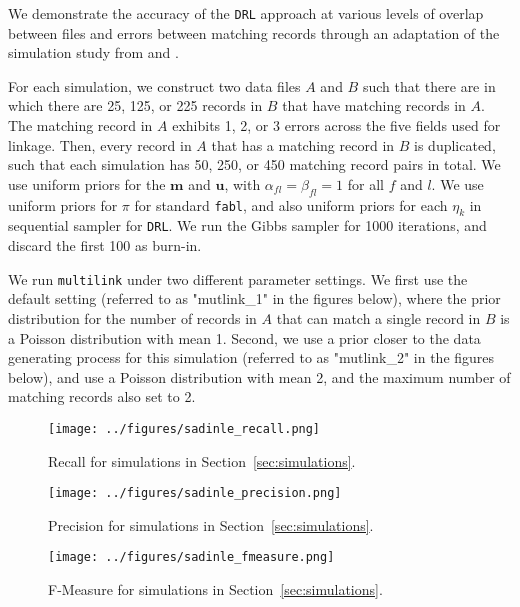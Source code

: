 \documentclass[12pt,letterpaper]{article}
\newcommand{\1}[1]{\mathbb{I}\!\left[#1\right]} %
\begin{document}
We demonstrate the accuracy of the \texttt{DRL} approach at various levels of overlap between files and errors between matching records through an adaptation of the simulation study from \cite{sadinle_bayesian_2017} and \cite{kundinger_2023}. 

For each simulation, we construct two data files $A$ and $B$ such that there are in which there are 25, 125, or 225 records in $B$ that have matching records in $A$. The matching record in $A$ exhibits 1, 2, or 3 errors across the five fields used for linkage. Then, every record in $A$ that has a matching record in $B$ is duplicated, such that each simulation has 50, 250, or 450 matching record pairs in total. We use uniform priors for the $\bm{m}$ and $\bm{u}$, with $\alpha_{fl} = \beta_{fl} = 1$ for all $f$ and $l$. We use uniform priors for $\pi$ for standard \texttt{fabl}, and also uniform priors for each $\eta_k$ in sequential sampler for \texttt{DRL}. We run the Gibbs sampler for 1000 iterations, and discard the first 100 as burn-in.

We run \texttt{multilink} under two different parameter settings. We first use the default setting (referred to as "mutlink\_1" in the figures below), where the prior distribution for the number of records in $A$ that can match a single record in $B$ is a Poisson distribution with mean 1. Second, we use a prior closer to the data generating process for this simulation (referred to as "mutlink\_2" in the figures below), and use a Poisson distribution with mean 2, and the maximum number of matching records also set to 2. 


\begin{figure}[t]
	\centering
	\texttt{[image: ../figures/sadinle\_recall.png]}
	\caption{Recall for simulations in Section~\ref{sec:simulations}.}
	\label{fig:sadinle-recall}
\end{figure}

\begin{figure}
	\centering
	\texttt{[image: ../figures/sadinle\_precision.png]}
	\caption{Precision for simulations in Section~\ref{sec:simulations}.}
	\label{fig:sadinle-precision}
\end{figure}

\begin{figure}
	\centering
	\texttt{[image: ../figures/sadinle\_fmeasure.png]}
	\caption{F-Measure for simulations in Section~\ref{sec:simulations}.}
	\label{fig:sadinle-fmeasure}
\end{figure}
\end{document}
